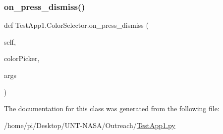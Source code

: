 \mbox{\label{classTestApp1_1_1ColorSelector_afcecec797d6c063981dd5c29a6b876a3}} 
\subsubsection{\texorpdfstring{on\+\_\+press\+\_\+dismiss()}{on\_press\_dismiss()}\hspace{0.1cm}{\footnotesize\ttfamily [2/2]}}
{\footnotesize\ttfamily def Test\+App1.\+Color\+Selector.\+on\+\_\+press\+\_\+dismiss (\begin{DoxyParamCaption}\item[{}]{self,  }\item[{}]{color\+Picker,  }\item[{}]{args }\end{DoxyParamCaption})}



The documentation for this class was generated from the following file\+:\begin{DoxyCompactItemize}
\item 
/home/pi/\+Desktop/\+U\+N\+T-\/\+N\+A\+S\+A/\+Outreach/\hyperlink{Outreach_2TestApp1_8py}{Test\+App1.\+py}\end{DoxyCompactItemize}
